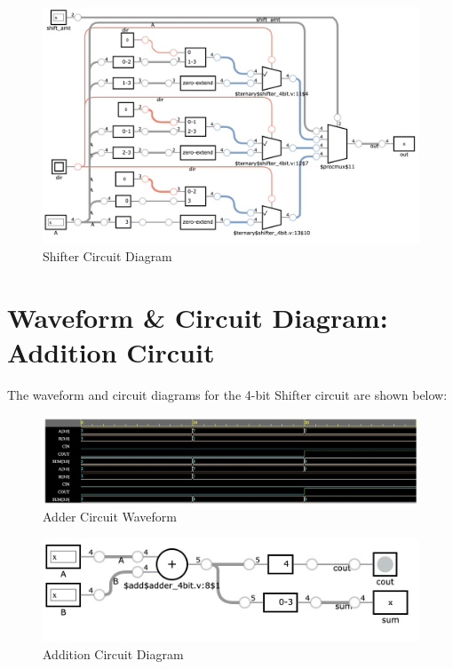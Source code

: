 \documentclass[runningheads, 12pt]{report}
\begin{document}
\begin{figure}[h]
	\centering
	\includegraphics[width=1.0\textwidth]{Shifter_4bit}
	\caption{Shifter Circuit Diagram}
	\label{fig: Shifter_4bit}
\end{figure}
\pagebreak

\section{Waveform \& Circuit Diagram: Addition Circuit}	

The waveform and circuit diagrams for the 4-bit Shifter circuit are shown below:

\begin{figure}[h]
	\centering
	\includegraphics[scale=0.25]{adder_waveform}
	\caption{Adder Circuit Waveform}
	\label{fig: adder_waveform}
\end{figure}

\begin{figure}[h]
	\centering
	\includegraphics[width=1.0\textwidth]{adder_4bit}
	\caption{Addition Circuit Diagram}
	\label{fig: adder_4bit}
\end{figure}	
\pagebreak
\end{document}
